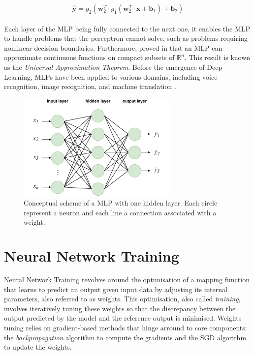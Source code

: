 \begin{equation}
  \label{eqn:dlo:mlp}
  \hat{\mathbf{y}} = g_2(\mathbf{w}_2^T \cdot  g_1(\mathbf{w}_2^T \cdot \mathbf{x} + \mathbf{b}_1) + \mathbf{b}_2)
\end{equation}\\

Each layer of the \ac{MLP} being fully connected to the next one, it enables the
\ac{MLP} to handle problems that the perceptron cannot solve, such as problems
requiring nonlinear decision boundaries. Furthermore,
\citeauthor{cybenko1989approximation} proved in \cite{cybenko1989approximation}
that an \ac{MLP} can approximate continuous functions on compact subsets of
$\mathds{R}^n$. This result is known as the \emph{Universal Approximation
Theorem}. Before the emergence of Deep Learning, \acp{MLP} have been applied to
various domains, including voice recognition, image recognition, and machine
translation \cite{wasserman1988neural}.


\begin{figure}[htbp]
  \centering
  \includegraphics[width=0.7\textwidth]{chapter_dlo/assets/mlp_scheme.pdf}
  \caption{Conceptual scheme of a \ac{MLP} with one hidden layer. Each circle
  represent a neuron and each line a connection associated with a weight.}
  \label{fig:dlo:mlp}
\end{figure}

\section{Neural Network Training}\label{sec:dlo:training}

Neural Network Training revolves around the optimisation of a mapping function
that learns to predict an output given input data by adjusting its internal
parameters, also referred to as weights. This optimisation, also called
\emph{training}, involves iteratively tuning these weights so that the
discrepancy between the output predicted by the model and the reference output
is minimised. Weights tuning relies on gradient-based methods that hinge
arround to core components: the \emph{backpropagation} algorithm to compute the
gradients and the \ac{SGD} algorithm to update the weights.

